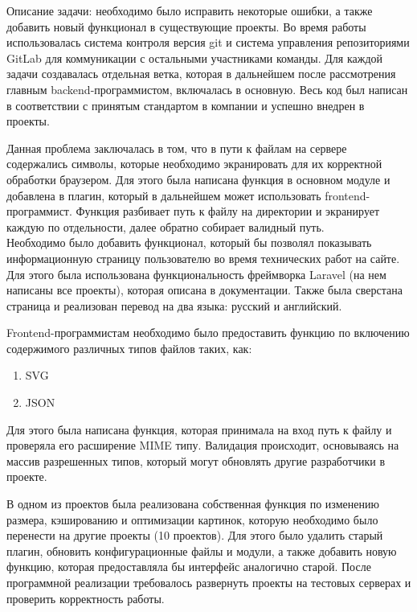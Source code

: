 Описание задачи: необходимо было исправить некоторые ошибки, а также добавить новый функционал
в существующие проекты. Во время работы использовалась система контроля версия git и система управления 
репозиториями GitLab для коммуникации с остальными участниками команды. Для каждой задачи создавалась 
отдельная ветка, которая в дальнейшем после рассмотрения главным backend-программистом, включалась в 
основную. Весь код был написан в соответствии с принятым стандартом в компании и успешно внедрен в проекты.

Данная проблема заключалась в том, что в пути к файлам на сервере содержались символы, которые 
необходимо экранировать для их корректной обработки браузером. Для этого была написана функция в 
основном модуле и добавлена в плагин, который в дальнейшем может использовать frontend-программист. 
Функция разбивает путь к файлу на директории и экранирует каждую по отдельности, далее обратно 
собирает валидный путь. \\

Необходимо было добавить функционал, который бы позволял показывать информационную страницу пользователю 
во время технических работ на сайте. Для этого была использована функциональность фреймворка Laravel
(на нем написаны все проекты), которая описана в документации. Также была сверстана страница и 
реализован перевод на два языка: русский и английский.

Frontend-программистам необходимо было предоставить функцию по включению содержимого различных типов файлов таких, 
как:
\begin{enumerate}
    \item SVG
    \item JSON
\end{enumerate}
Для этого была написана функция, которая принимала на вход путь к файлу и проверяла его расширение MIME типу. 
Валидация происходит, основываясь на массив разрешенных типов, который могут обновлять другие разработчики в 
проекте.

В одном из проектов была реализована собственная функция по изменению размера, кэшированию и оптимизации 
картинок, которую необходимо было перенести на другие проекты (10 проектов). Для этого было удалить старый 
плагин, обновить конфигурационные файлы и модули, а также добавить новую функцию, которая предоставляла бы 
интерфейс аналогично старой. После программной реализации требовалось развернуть проекты на тестовых серверах 
и проверить корректность работы.

